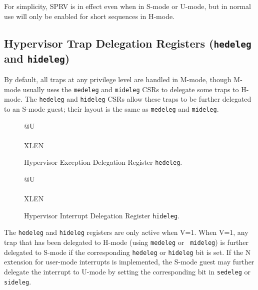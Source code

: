 \begin{commentary}
For simplicity, SPRV is in effect even when in S-mode or U-mode, but in normal
use will only be enabled for short sequences in H-mode.
\end{commentary}

\subsection{Hypervisor Trap Delegation Registers ({\tt hedeleg} and {\tt hideleg})}

By default, all traps at any privilege level are handled in M-mode, though
M-mode usually uses the {\tt medeleg} and {\tt mideleg} CSRs to delegate
some traps to H-mode.  The {\tt hedeleg} and {\tt hideleg} CSRs allow these
traps to be further delegated to an S-mode guest; their layout is the same
as {\tt medeleg} and {\tt mideleg}.

\begin{figure}[h!]
{\footnotesize
\begin{center}
\begin{tabular}{@{}U}
 \\
\hline
{} \\
\hline
XLEN \\
\end{tabular}
\end{center}
}
\vspace{-0.1in}
\caption{Hypervisor Exception Delegation Register {\tt hedeleg}.}
\label{hedelegreg}
\end{figure}

\begin{figure}[h!]
{\footnotesize
\begin{center}
\begin{tabular}{@{}U}
 \\
\hline
{} \\
\hline
XLEN \\
\end{tabular}
\end{center}
}
\vspace{-0.1in}
\caption{Hypervisor Interrupt Delegation Register {\tt hideleg}.}
\label{hidelegreg}
\end{figure}

The {\tt hedeleg} and {\tt hideleg} registers are only active when V=1.  When
V=1, any trap that has been delegated to H-mode (using {\tt medeleg} or {\tt
mideleg}) is further delegated to S-mode if the corresponding {\tt hedeleg} or
{\tt hideleg} bit is set.  If the N extension for user-mode interrupts
is implemented, the S-mode guest may further delegate the interrupt
to U-mode by setting the corresponding bit in {\tt sedeleg} or {\tt sideleg}.

